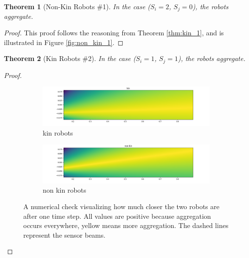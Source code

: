 \documentclass[letterpaper, 10 pt, conference]{ieeeconf}
\newtheorem{theorem}{Theorem}
\begin{document}
\begin{theorem}[Non-Kin Robots \#1]\label{thm:non_kin_1}
  In the case ($S_i=2$, $S_j=0$), the robots aggregate.
\end{theorem}
\begin{proof}

  This proof follows the reasoning from Theorem \ref{thm:kin_1}, and is illustrated in Figure \ref{fig:non_kin_1}.
\end{proof}

\begin{theorem}[Kin Robots \#2]\label{thm:kin_2}
  In the case ($S_i=1$, $S_j=1$), the robots aggregate.
\end{theorem}
\begin{proof}

  \begin{figure}
    \centering
    \begin{subfigure}[t]{1\columnwidth}
      \includegraphics[width=1\columnwidth]{./images/kin_2}
      \caption{kin robots}
      \label{fig:kin_2}
    \end{subfigure}

    \begin{subfigure}[t]{1\columnwidth}
      \includegraphics[width=1\columnwidth]{./images/non_kin_2}
      \caption{non kin robots}
      \label{fig:non_kin_2}
    \end{subfigure}
    \caption{A numerical check visualizing how much closer the two robots are after one time step. All values are positive because aggregation occurs everywhere, yellow means more aggregation. The dashed lines represent the sensor beams.}
  \end{figure}


\end{proof}
\end{document}
